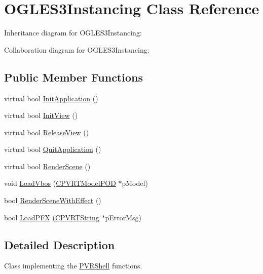 \hypertarget{class_o_g_l_e_s3_instancing}{\section{O\+G\+L\+E\+S3\+Instancing Class Reference}
\label{class_o_g_l_e_s3_instancing}
}


Inheritance diagram for O\+G\+L\+E\+S3\+Instancing\+:


Collaboration diagram for O\+G\+L\+E\+S3\+Instancing\+:
\subsection*{Public Member Functions}
\begin{DoxyCompactItemize}
\item 
virtual bool \hyperlink{class_o_g_l_e_s3_instancing_a1be810ce5e0063eba3aed9d9555c789b}{Init\+Application} ()
\item 
virtual bool \hyperlink{class_o_g_l_e_s3_instancing_ab6cef734d9860f8de78045187fffab46}{Init\+View} ()
\item 
virtual bool \hyperlink{class_o_g_l_e_s3_instancing_a173f9fffc237a499351b91917828a79e}{Release\+View} ()
\item 
virtual bool \hyperlink{class_o_g_l_e_s3_instancing_a3f92e6d5fcfa28e6fe8f1f98de51a6ea}{Quit\+Application} ()
\item 
virtual bool \hyperlink{class_o_g_l_e_s3_instancing_aac87b19c8dcf9d0cd530eef9496c8a41}{Render\+Scene} ()
\item 
void \hyperlink{class_o_g_l_e_s3_instancing_a6df2674b9bf03800e8cbc9ac0a9bb468}{Load\+Vbos} (\hyperlink{class_c_p_v_r_t_model_p_o_d}{C\+P\+V\+R\+T\+Model\+P\+O\+D} $\ast$p\+Model)
\item 
bool \hyperlink{class_o_g_l_e_s3_instancing_a41d4050b62ca3b7cbad6393445f2402a}{Render\+Scene\+With\+Effect} ()
\item 
bool \hyperlink{class_o_g_l_e_s3_instancing_afb418bcfd59ec60e0a66e9a859773c37}{Load\+P\+F\+X} (\hyperlink{class_c_p_v_r_t_string}{C\+P\+V\+R\+T\+String} $\ast$p\+Error\+Msg)
\end{DoxyCompactItemize}


\subsection{Detailed Description}


 Class implementing the \hyperlink{class_p_v_r_shell}{P\+V\+R\+Shell} functions. 

